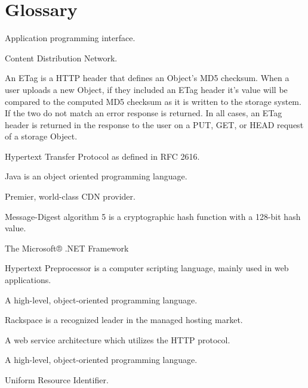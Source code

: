 \documentclass[letterpaper,10pt,english]{manual}
\begin{document}
\chapter{Glossary}
\begin{description}
\item[API]\hypertarget{term-api}{}
Application programming interface.

\item[CDN]\hypertarget{term-cdn}{}
Content Distribution Network.

\item[ETag]\hypertarget{term-etag}{}
An ETag is a HTTP header that defines an Object's MD5 checksum.
When a user uploads a new Object, if they included an ETag header
it's value will be compared to the computed MD5 checksum as it
is written to the storage system.  If the two do not match an
error response is returned.  In all cases, an ETag header is
returned in the response to the user on a PUT, GET, or HEAD
request of a storage Object.

\item[HTTP]\hypertarget{term-http}{}
Hypertext Transfer Protocol as defined in RFC 2616.

\item[Java]\hypertarget{term-java}{}
Java is an object oriented programming language.

\item[Limelight Networks]\hypertarget{term-limelight-networks}{}
Premier, world-class CDN provider.

\item[MD5]\hypertarget{term-md5}{}
Message-Digest algorithm 5 is a cryptographic hash function
with a 128-bit hash value.

\item[.NET]\hypertarget{term-net}{}
The Microsoft® .NET Framework

\item[PHP]\hypertarget{term-php}{}
Hypertext Preprocessor is a computer scripting language, mainly
used in web applications.

\item[Python]\hypertarget{term-python}{}
A high-level, object-oriented programming language.

\item[Rackspace]\hypertarget{term-rackspace}{}
Rackspace is a recognized leader in the managed hosting market.

\item[ReST]\hypertarget{term-rest}{}
A web service architecture which utilizes the HTTP protocol.

\item[Ruby]\hypertarget{term-ruby}{}
A high-level, object-oriented programming language.

\item[URI]\hypertarget{term-uri}{}
Uniform Resource Identifier.

\end{description}


\renewcommand{\indexname}{Module Index}

\renewcommand{\indexname}{Index}
\printindex
\end{document}
